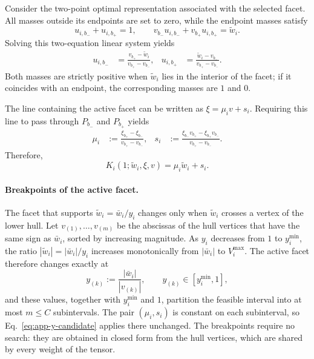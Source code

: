 \documentclass{article}
\begin{document}
Consider the two-point optimal representation associated with the selected
facet. All masses outside its endpoints are set to zero, while the endpoint
masses satisfy
\[
  u_{i,b_-}+u_{i,b_+}=1,
  \qquad
  v_{b_-}u_{i,b_-}+v_{b_+}u_{i,b_+}=\widetilde w_i.
\]
Solving this two-equation linear system yields
\begin{align}
  u_{i,b_-}
  &=
  \frac{v_{b_+}-\widetilde w_i}{v_{b_+}-v_{b_-}},
  &
  u_{i,b_+}
  &=
  \frac{\widetilde w_i-v_{b_-}}{v_{b_+}-v_{b_-}}.
  \label{eq:active-masses}
\end{align}
Both masses are strictly positive when $\widetilde w_i$ lies in the interior
of the facet; if it coincides with an endpoint, the corresponding masses are
$1$ and $0$.

The line containing the active facet can be written as
$\xi=\mu_i v+s_i$. Requiring this line to pass through $P_{b_-}$ and
$P_{b_+}$ yields
\begin{align}
  \mu_i
  &:=
  \frac{\xi_{b_+}-\xi_{b_-}}{v_{b_+}-v_{b_-}},
  &
  s_i
  &:=
  \frac{\xi_{b_-}v_{b_+}-\xi_{b_+}v_{b_-}}
       {v_{b_+}-v_{b_-}}.
  \label{eq:slope-intercept}
\end{align}
Therefore,
\begin{equation}
  K_i(1;\widetilde w_i,\xi,v)
  =\mu_i\widetilde w_i+s_i.
  \label{eq:lower-hull}
\end{equation}

\paragraph{Breakpoints of the active facet.}
The facet that supports $\widetilde w_i=\bar w_i/y_i$ changes only when
$\widetilde w_i$ crosses a vertex of the lower hull. Let
$v_{(1)},\dots,v_{(m)}$ be the abscissas of the hull vertices that have the
same sign as $\bar w_i$, sorted by increasing magnitude. As $y_i$ decreases
from $1$ to $y_i^{\min}$, the ratio $|\widetilde w_i|=|\bar w_i|/y_i$ increases
monotonically from $|\bar w_i|$ to $V_i^{\max}$. The active facet therefore
changes exactly at
\begin{equation}
  y_{(k)}
  :=
  \frac{|\bar w_i|}{|v_{(k)}|},
  \qquad
  y_{(k)}\in[y_i^{\min},1],
  \label{eq:app-breakpoints}
\end{equation}
and these values, together with $y_i^{\min}$ and $1$, partition the feasible
interval into at most $m\leq C$ subintervals. The pair $(\mu_i,s_i)$ is
constant on each subinterval, so Eq.~\eqref{eq:app-y-candidate} applies there
unchanged. The breakpoints require no search: they are obtained in closed form
from the hull vertices, which are shared by every weight of the tensor.
\end{document}
